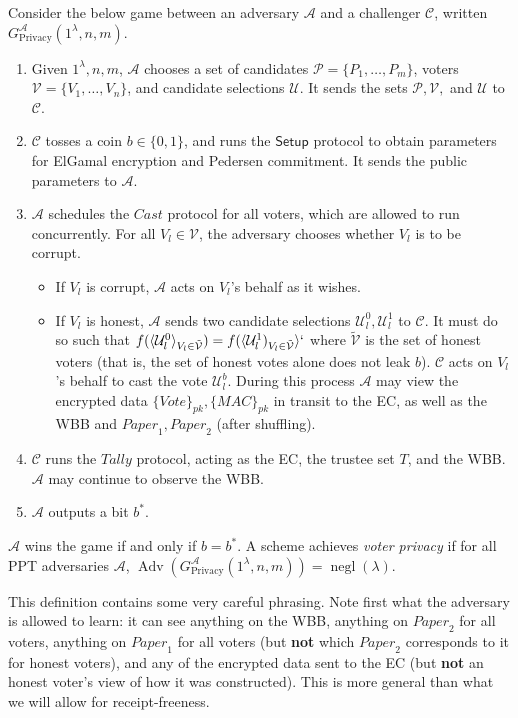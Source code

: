 \documentclass[12pt,a4paper]{article}
\DeclareMathOperator{\negl}{\text{negl}}
\DeclareMathOperator{\Adv}{\text{Adv}}
\theoremstyle{definition}
\newcommand{\Vote}{\mathit{Vote}}
\newcommand{\Paper}{\mathit{Paper}}
\newcommand{\Mac}{\mathit{MAC}}
\begin{document}
\begin{definition}
    Consider the below game between an adversary $\mathcal{A}$ and a challenger $\mathcal{C}$, written $G^\mathcal{A}_{\text{Privacy}}(1^\lambda, n, m)$.
    \begin{enumerate}
        \item Given $1^\lambda, n, m$, $\mathcal{A}$ chooses a set of candidates $\mathcal{P}=\{P_1,\ldots,P_m\}$, voters $\mathcal{V}=\{V_1,\ldots,V_n\}$, and candidate selections $\mathcal{U}$. It sends the sets $\mathcal{P}, \mathcal{V},$ and $\mathcal{U}$ to $\mathcal{C}$.
        \item $\mathcal{C}$ tosses a coin $b\in\{0, 1\}$, and runs the $\mathsf{Setup}$ protocol to obtain parameters for ElGamal encryption and Pedersen commitment. It sends the public parameters to $\mathcal{A}$.
        \item $\mathcal{A}$ schedules the $\mathit{Cast}$ protocol for all voters, which are allowed to run concurrently. For all $V_l\in\mathcal{V}$, the adversary chooses whether $V_l$ is to be corrupt.
        \begin{itemize}
            \item If $V_l$ is corrupt, $\mathcal{A}$ acts on $V_l$'s behalf as it wishes.
            \item If $V_l$ is honest, $\mathcal{A}$ sends two candidate selections $\mathcal{U}_l^0, \mathcal{U}_l^1$ to $\mathcal{C}$. It must do so such that $f(\langle\mathcal{U}_l^0\rangle_{V_l\in \tilde{\mathcal{V}}})=f(\langle\mathcal{U}^1_l)_{V_l\in \tilde{\mathcal{V}}}\rangle`$ where $\tilde{\mathcal{V}}$ is the set of honest voters (that is, the set of honest votes alone does not leak $b$). $\mathcal{C}$ acts on $V_l$'s behalf to cast the vote $\mathcal{U}_l^b$. During this process $\mathcal{A}$ may view the encrypted data $\{\Vote\}_{\mathit{pk}}, \{\Mac\}_{\mathit{pk}}$ in transit to the EC, as well as the WBB and $\Paper_1, \Paper_2$ (after shuffling).
        \end{itemize}
        \item $\mathcal{C}$ runs the $\mathit{Tally}$ protocol, acting as the EC, the trustee set $T$, and the WBB. $\mathcal{A}$ may continue to observe the WBB.
        \item $\mathcal{A}$ outputs a bit $b^*$.
    \end{enumerate}
    $\mathcal{A}$ wins the game if and only if $b=b^*$. A scheme achieves \textit{voter privacy} if for all PPT adversaries $\mathcal{A}$, $\Adv\left(G^\mathcal{A}_{\text{Privacy}}(1^\lambda, n, m)\right)=\negl(\lambda)$.
\end{definition}
This definition contains some very careful phrasing. Note first what the adversary is allowed to learn: it can see anything on the WBB, anything on $\Paper_2$ for all voters, anything on $\Paper_1$ for all voters (but \textbf{not} which $\Paper_2$ corresponds to it for honest voters), and any of the encrypted data sent to the EC (but \textbf{not} an honest voter's view of how it was constructed). This is more general than what we will allow for receipt-freeness.
\end{document}
